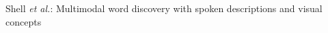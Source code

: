 \documentclass[journal]{IEEEtran}
\begin{document}
%
{Shell \MakeLowercase{\textit{et al.}}: Multimodal word discovery with spoken descriptions and visual concepts}
% 











\maketitle
\end{document}
